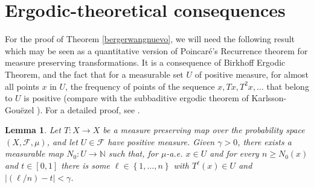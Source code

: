 \documentclass[11pt]{article}
\let\mathcal\mathscr
\theoremstyle{plain}
\newtheorem{lema}[teo]{Lemma}
\theoremstyle{definition}
\newcommand{\NN}{\mathbb{N}}
\newcommand{\corchete}[1]{\left\{{#1}\right\}}
\begin{document}
\section{Ergodic-theoretical consequences}\label{seccioncinco}
For the proof of Theorem \ref{bergerwangnuevo}, we will need the following result which may be seen as a quantitative version of Poincaré's Recurrence theorem for measure preserving transformations. It is a consequence of Birkhoff Ergodic Theorem, and the fact that for a measurable set $U$ of positive measure, for almost all points $x$ in $U$, the frequency of points of the sequence $x,Tx,T^{2}x,\dots$ that belong to $U$ is positive (compare with the subbaditive ergodic theorem of Karlsson-Gouëzel \cite[Th.\,1.1]{goukar}). For a detailed proof, see \cite[Lem.\,3.12]{bochilya}.
\begin{lema}\label{superpoincare}
Let $T:X\rightarrow X$ be a measure preserving map over the probability space $(X,\mathcal{F},\mu)$, and let $U\in \mathcal{F}$ have positive measure. Given $\gamma>0$, there exists a measurable map $N_0:U\rightarrow \NN$ such that, for $\mu$-a.e. $x\in U$ and for every $n\geq N_{0}(x)$ and $t\in [0,1]$ there is some $\ell \in \corchete{1,\dots,n}$ with $T^{\ell}(x)\in U$ and $|(\ell/n)-t|<\gamma$.
\end{lema}
\end{document}
